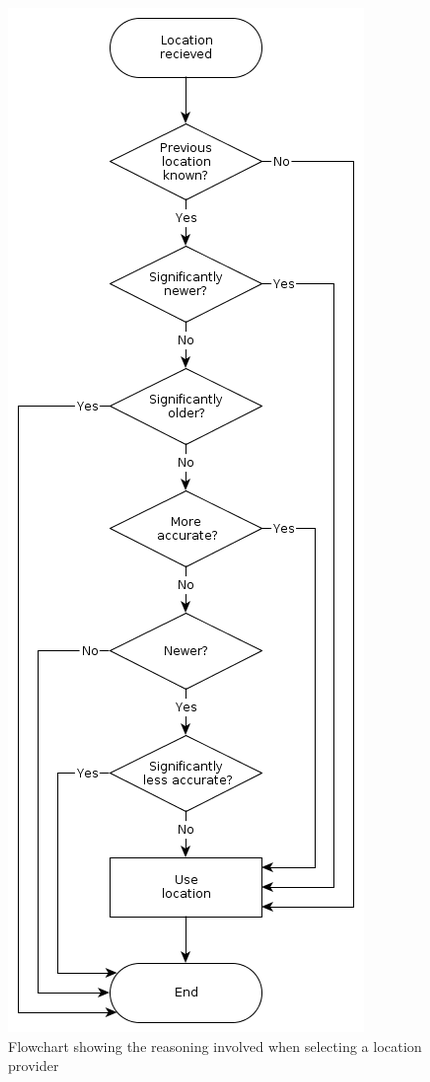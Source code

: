 \begin{figure}[H]
  \centering
   \includegraphics[height=0.9\textheight]{Images/diagrams/location.png}
  \caption{Flowchart showing the reasoning involved when selecting a location provider}
  \label{fig:location}
\end{figure}


